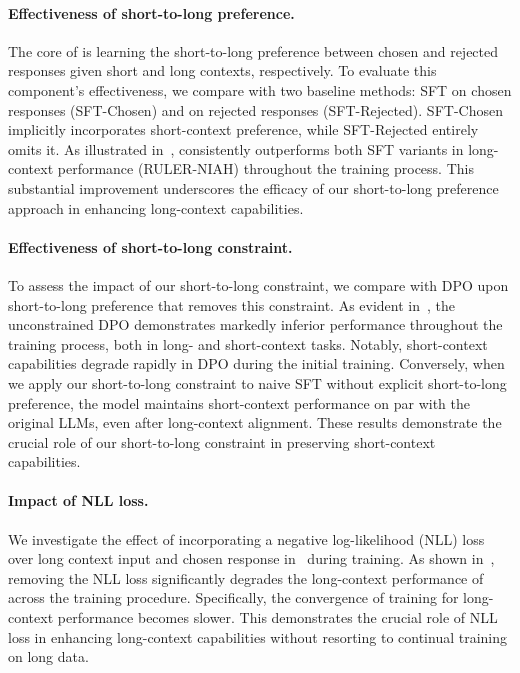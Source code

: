 \paragraph{Effectiveness of short-to-long preference.} The core of \ourMethod{} is learning the short-to-long preference between chosen and rejected responses given short and long contexts, respectively. To evaluate this component's effectiveness, we compare \ourMethod{} with two baseline methods: SFT on chosen responses (SFT-Chosen) and on rejected responses (SFT-Rejected). SFT-Chosen implicitly incorporates short-context preference, while SFT-Rejected entirely omits it. As illustrated in~, \ourMethod{} consistently outperforms both SFT variants in long-context performance (RULER-NIAH) throughout the training process. This substantial improvement underscores the efficacy of our short-to-long preference approach in enhancing long-context capabilities.

\paragraph{Effectiveness of short-to-long constraint.} To assess the impact of our short-to-long constraint, we compare \ourMethod{} with DPO upon short-to-long preference that removes this constraint. As evident in~, the unconstrained DPO demonstrates markedly inferior performance throughout the training process, both in long- and short-context tasks. Notably, short-context capabilities degrade rapidly in DPO during the initial training. Conversely, when we apply our short-to-long constraint to naive SFT without explicit short-to-long preference, the model maintains short-context performance on par with the original LLMs, even after long-context alignment. These results demonstrate the crucial role of our short-to-long constraint in preserving short-context capabilities.


\paragraph{Impact of NLL loss.} 
We investigate the effect of incorporating a negative log-likelihood (NLL) loss over long context input and chosen response in~ during \ourMethod{} training. As shown in~, removing the NLL loss significantly degrades the long-context performance of \ourMethod{} across the training procedure. Specifically, the convergence of training for long-context performance becomes slower. This demonstrates the crucial role of NLL loss in enhancing long-context capabilities without resorting to continual training on long data.

